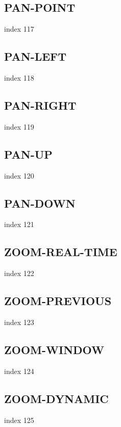 \documentclass[a4paper]{report}
\begin{document}
{{{{{{{{{{{{{\subsection{PAN-POINT}

index 117

\subsection{PAN-LEFT}

index 118

\subsection{PAN-RIGHT}

index 119

\subsection{PAN-UP}

index 120

\subsection{PAN-DOWN}

index 121

\subsection{ZOOM-REAL-TIME}

index 122

\subsection{ZOOM-PREVIOUS}

index 123

\subsection{ZOOM-WINDOW}

index 124

\subsection{ZOOM-DYNAMIC}

index 125

}}}}}}}}}}}}}
\end{document}
